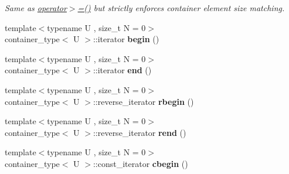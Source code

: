 \begin{DoxyCompactItemize}
\begin{DoxyCompactList}\small\item\em Same as \hyperlink{classheterogeneous_1_1heterovector_3_01_t_00_01_types_8_8_8_4_a2d4c9629e9441620fa811369c1cf1e7a}{operator$>$=()} but strictly enforces container element size matching. \end{DoxyCompactList}\item 
\hypertarget{classheterogeneous_1_1heterovector_3_01_t_00_01_types_8_8_8_4_aaa3449bdc9eeb9224cf1c4a7a2d89ea8}{}{\footnotesize template$<$typename U , size\+\_\+t N = 0$>$ }\\container\+\_\+type$<$ U $>$\+::iterator {\bfseries begin} ()\label{classheterogeneous_1_1heterovector_3_01_t_00_01_types_8_8_8_4_aaa3449bdc9eeb9224cf1c4a7a2d89ea8}

\item 
\hypertarget{classheterogeneous_1_1heterovector_3_01_t_00_01_types_8_8_8_4_a05261a5abfac5820d3ed3ba9ce1d6f57}{}{\footnotesize template$<$typename U , size\+\_\+t N = 0$>$ }\\container\+\_\+type$<$ U $>$\+::iterator {\bfseries end} ()\label{classheterogeneous_1_1heterovector_3_01_t_00_01_types_8_8_8_4_a05261a5abfac5820d3ed3ba9ce1d6f57}

\item 
\hypertarget{classheterogeneous_1_1heterovector_3_01_t_00_01_types_8_8_8_4_ae20fd2111618e2312c1402cc3da6e178}{}{\footnotesize template$<$typename U , size\+\_\+t N = 0$>$ }\\container\+\_\+type$<$ U $>$\+::reverse\+\_\+iterator {\bfseries rbegin} ()\label{classheterogeneous_1_1heterovector_3_01_t_00_01_types_8_8_8_4_ae20fd2111618e2312c1402cc3da6e178}

\item 
\hypertarget{classheterogeneous_1_1heterovector_3_01_t_00_01_types_8_8_8_4_a5136941ab39ccc29d3e67682d1874222}{}{\footnotesize template$<$typename U , size\+\_\+t N = 0$>$ }\\container\+\_\+type$<$ U $>$\+::reverse\+\_\+iterator {\bfseries rend} ()\label{classheterogeneous_1_1heterovector_3_01_t_00_01_types_8_8_8_4_a5136941ab39ccc29d3e67682d1874222}

\item 
\hypertarget{classheterogeneous_1_1heterovector_3_01_t_00_01_types_8_8_8_4_a8c4d3926d55392c5d74a368d138ff002}{}{\footnotesize template$<$typename U , size\+\_\+t N = 0$>$ }\\container\+\_\+type$<$ U $>$\+::const\+\_\+iterator {\bfseries cbegin} ()\label{classheterogeneous_1_1heterovector_3_01_t_00_01_types_8_8_8_4_a8c4d3926d55392c5d74a368d138ff002}


\end{DoxyCompactItemize}
